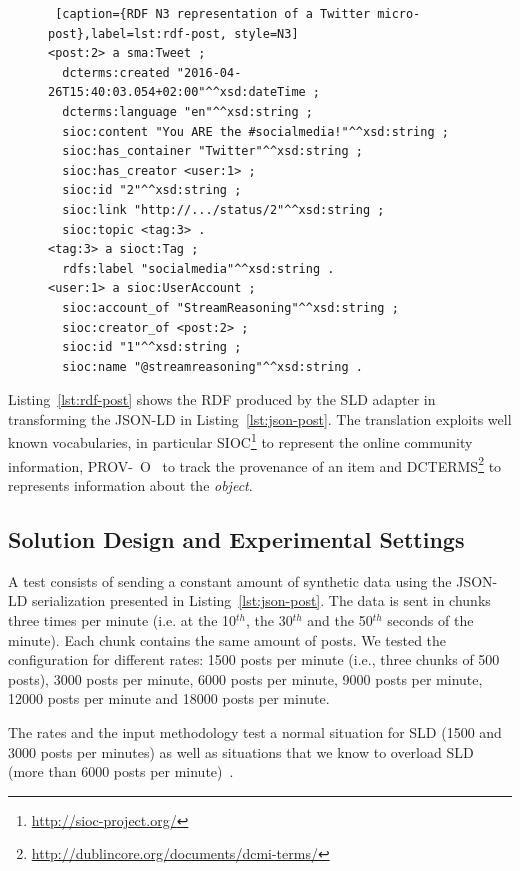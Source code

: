 {\begin{figure}[ht]
\begin{minipage}{0.95\linewidth}
\begin{lstlisting} [caption={RDF N3 representation of a Twitter micro-post},label=lst:rdf-post, style=N3]
<post:2> a sma:Tweet ;
  dcterms:created "2016-04-26T15:40:03.054+02:00"^^xsd:dateTime ;
  dcterms:language "en"^^xsd:string ;
  sioc:content "You ARE the #socialmedia!"^^xsd:string ;
  sioc:has_container "Twitter"^^xsd:string ;
  sioc:has_creator <user:1> ;
  sioc:id "2"^^xsd:string ;
  sioc:link "http://.../status/2"^^xsd:string ;
  sioc:topic <tag:3> .
<tag:3> a sioct:Tag ;
  rdfs:label "socialmedia"^^xsd:string .
<user:1> a sioc:UserAccount ;
  sioc:account_of "StreamReasoning"^^xsd:string ;
  sioc:creator_of <post:2> ;
  sioc:id "1"^^xsd:string ;
  sioc:name "@streamreasoning"^^xsd:string .
\end{lstlisting}
\end{minipage}
\end{figure}

Listing~\ref{lst:rdf-post} shows the RDF produced by the SLD adapter in transforming the JSON-LD in Listing~\ref{lst:json-post}. The translation exploits well known vocabularies, in particular SIOC\footnote{\url{http://sioc-project.org/}} to represent the online community information, PROV-~O~\cite{w3c-prov-o} to track the provenance of an item and DCTERMS\footnote{\url{http://dublincore.org/documents/dcmi-terms/}} to represents information about the \textit{object}.

\subsection{Solution Design and Experimental Settings} 
A test consists of sending a constant amount of synthetic data using the JSON-LD serialization presented in Listing~\ref{lst:json-post}.
The data is sent in chunks three times per minute (i.e. at the 10$^{th}$, the 30$^{th}$ and the 50$^{th}$ seconds of the minute).  Each chunk contains the same amount of posts. We tested the configuration for different rates: 1500 posts per minute (i.e., three chunks of 500 posts), 3000 posts per minute, 6000 posts per minute, 9000 posts per minute, 12000 posts per minute and 18000 posts per minute.

The rates and the input methodology test a normal situation for SLD (1500 and 3000 posts per minutes) as well as situations that we know to overload SLD (more than 6000 posts per minute)~\cite{DBLP:conf/esws/BalduiniV017a}.

}
